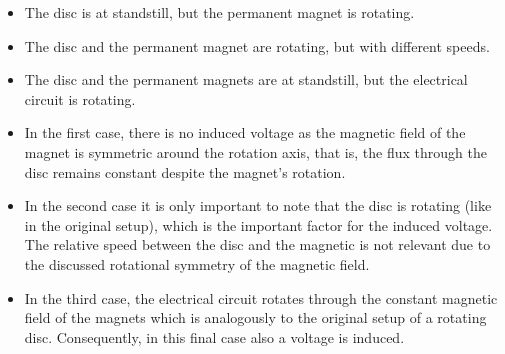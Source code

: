 \begin{itemize}    
    \item The disc is at standstill, but the permanent magnet is rotating.
    \item The disc and the permanent magnet are rotating, but with different speeds.
    \item The disc and the permanent magnets are at standstill, but the  electrical circuit is rotating. 
\end{itemize}

\begin{solutionblock}
    \begin{itemize}
        \item In the first case, there is no induced voltage as the magnetic field of the magnet is symmetric around the rotation axis, that is, the flux through the disc remains constant despite the magnet's rotation.
        \item In the second case it is only important to note that the disc is rotating (like in the original setup), which is the important factor for the induced voltage. The relative speed between the disc and the magnetic is not relevant due to the discussed rotational symmetry of the magnetic field.
        \item In the third case, the electrical circuit rotates through the constant magnetic field of the magnets which is analogously to the original setup of a rotating disc. Consequently, in this final case also a voltage is induced.
    \end{itemize}
\end{solutionblock}